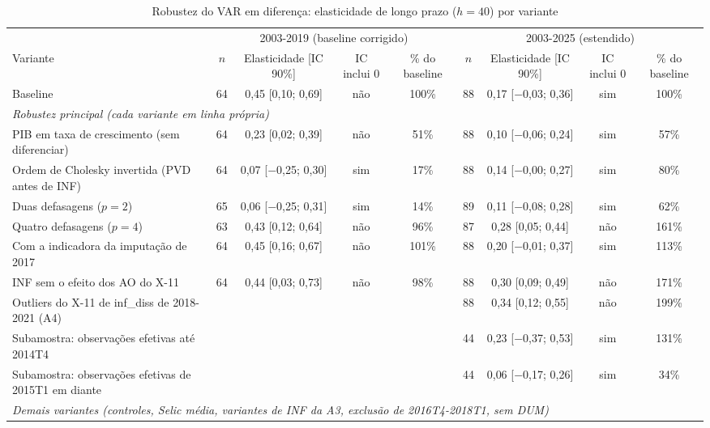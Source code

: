 \begin{table}[htbp]
\centering
\caption{Robustez do VAR em diferen\c{c}a: elasticidade de longo prazo ($h = 40$) por variante}
\label{tab:a6_var_rob}
\scriptsize
\begin{adjustbox}{max width=\linewidth}
\begin{tabular}{p{4.6cm}cccccccc}
\toprule
& \multicolumn{4}{c}{2003-2019 (baseline corrigido)} & \multicolumn{4}{c}{2003-2025 (estendido)} \\
\cmidrule(lr){2-5}\cmidrule(lr){6-9}
Variante & $n$ & Elasticidade [IC 90\%] & IC inclui 0 & \% do baseline & $n$ & Elasticidade [IC 90\%] & IC inclui 0 & \% do baseline \\
\midrule
Baseline & 64 & 0{,}45 [0{,}10; 0{,}69] & n\~ao & 100\% & 88 & 0{,}17 [$-$0{,}03; 0{,}36] & sim & 100\% \\
\multicolumn{9}{l}{\textit{Robustez principal (cada variante em linha pr\'opria)}} \\
PIB em taxa de crescimento (sem diferenciar) & 64 & 0{,}23 [0{,}02; 0{,}39] & n\~ao & 51\% & 88 & 0{,}10 [$-$0{,}06; 0{,}24] & sim & 57\% \\
Ordem de Cholesky invertida (PVD antes de INF) & 64 & 0{,}07 [$-$0{,}25; 0{,}30] & sim & 17\% & 88 & 0{,}14 [$-$0{,}00; 0{,}27] & sim & 80\% \\
Duas defasagens ($p = 2$) & 65 & 0{,}06 [$-$0{,}25; 0{,}31] & sim & 14\% & 89 & 0{,}11 [$-$0{,}08; 0{,}28] & sim & 62\% \\
Quatro defasagens ($p = 4$) & 63 & 0{,}43 [0{,}12; 0{,}64] & n\~ao & 96\% & 87 & 0{,}28 [0{,}05; 0{,}44] & n\~ao & 161\% \\
Com a indicadora da imputa\c{c}\~ao de 2017 & 64 & 0{,}45 [0{,}16; 0{,}67] & n\~ao & 101\% & 88 & 0{,}20 [$-$0{,}01; 0{,}37] & sim & 113\% \\
INF sem o efeito dos AO do X-11 & 64 & 0{,}44 [0{,}03; 0{,}73] & n\~ao & 98\% & 88 & 0{,}30 [0{,}09; 0{,}49] & n\~ao & 171\% \\
Outliers do X-11 de inf\_diss de 2018-2021 (A4) &  &  &  &  & 88 & 0{,}34 [0{,}12; 0{,}55] & n\~ao & 199\% \\
Subamostra: observa\c{c}\~oes efetivas at\'e 2014T4 & & & & & 44 & 0{,}23 [$-$0{,}37; 0{,}53] & sim & 131\% \\
Subamostra: observa\c{c}\~oes efetivas de 2015T1 em diante & & & & & 44 & 0{,}06 [$-$0{,}17; 0{,}26] & sim & 34\% \\
\multicolumn{9}{l}{\textit{Demais variantes (controles, Selic m\'edia, variantes de INF da A3, exclus\~ao de 2016T4-2018T1, sem DUM)}} \\

\end{tabular}
\end{adjustbox}
\end{table}
